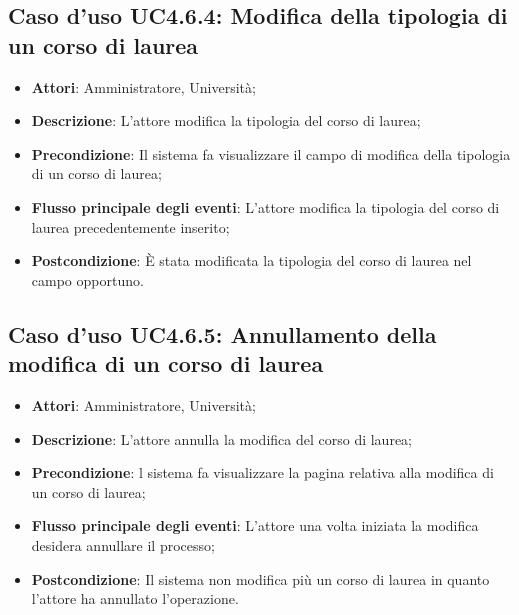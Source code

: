 \subsection{Caso d'uso \texorpdfstring{UC4.6.4}{UC4.6.4}: Modifica della tipologia di un corso di laurea}
\begin{itemize}
	\item \textbf{Attori}: Amministratore, Università;
	\item \textbf{Descrizione}: L'attore modifica la tipologia del corso di laurea;
	
	\item \textbf{Precondizione}: Il sistema fa visualizzare il campo di modifica della tipologia di un corso di laurea;
	
	
	\item \textbf{Flusso principale degli eventi}: L'attore modifica la tipologia del corso di laurea precedentemente inserito;
	
	\item \textbf{Postcondizione}: È stata modificata la tipologia del corso di laurea nel campo opportuno.
	
\end{itemize}
\subsection{Caso d'uso \texorpdfstring{UC4.6.5}{UC4.6.5}: Annullamento della modifica di un corso di laurea}
\begin{itemize}
	\item \textbf{Attori}: Amministratore, Università;
	\item \textbf{Descrizione}: L'attore annulla la modifica del corso di laurea;
	
	\item \textbf{Precondizione}: l sistema fa visualizzare la pagina relativa alla modifica di un corso di laurea;
	
	\item \textbf{Flusso principale degli eventi}: L'attore una volta iniziata la modifica desidera annullare il processo;
	
	\item \textbf{Postcondizione}: Il sistema non modifica più un corso di laurea in quanto l'attore ha annullato l'operazione.
	
\end{itemize}
